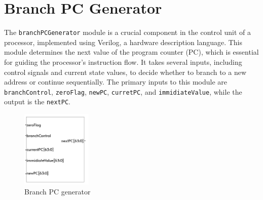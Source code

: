 \newpage
\section{Branch PC Generator}
The \texttt{branchPCGenerator} module is a crucial component in the control unit of a processor, implemented using Verilog, a hardware description language. This module determines the next value of the program counter (PC), which is essential for guiding the processor's instruction flow. It takes several inputs, including control signals and current state values, to decide whether to branch to a new address or continue sequentially. The primary inputs to this module are \texttt{branchControl}, \texttt{zeroFlag}, \texttt{newPC}, \texttt{curretPC}, and \texttt{immidiateValue}, while the output is the \texttt{nextPC}.

\begin{figure}[H]
    \centering
    \includegraphics[width=0.3\textwidth, height=0.23\textheight]{Image/02_BPC.png}
    \caption{Branch PC generator}
    \label{fig:Branch PC generator}
\end{figure}

